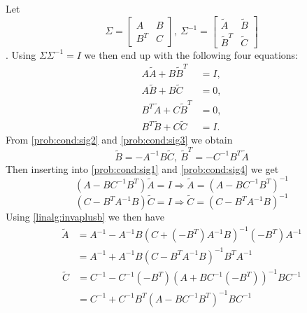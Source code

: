 Let
\begin{equation}
\Sigma = \begin{bmatrix}
A & B \\
B^T & C
\end{bmatrix},\ 
\Sigma^{-1} = \begin{bmatrix}
\tilde{A} & \tilde{B} \\
\tilde{B}^T & \tilde{C}
\end{bmatrix}
\end{equation}.
Using $\Sigma \Sigma^{-1}=I$ we then end up with the following four equations:
\begin{align}
A\tilde{A}+B\tilde{B}^T &= I, \label{prob:cond:sig1} \\
A\tilde{B} + B\tilde{C} &= 0, \label{prob:cond:sig2}\\
B^T\tilde{A} + C\tilde{B}^T &= 0, \label{prob:cond:sig3}\\
B^T\tilde{B} + C\tilde{C} &= I. \label{prob:cond:sig4}
\end{align}
From \eqref{prob:cond:sig2} and \eqref{prob:cond:sig3} we obtain
\begin{equation}
\tilde{B} = -A^{-1}B\tilde{C},\ \tilde{B}^T=-C^{-1}B^T\tilde{A}
\end{equation}
Then inserting into \eqref{prob:cond:sig1} and \eqref{prob:cond:sig4} we get
\begin{equation}
(A-BC^{-1}B^T)\tilde{A} = I \Rightarrow \tilde{A} = (A-BC^{-1}B^T)^{-1}
\end{equation}
\begin{equation}
(C-B^TA^{-1}B)\tilde{C} = I \Rightarrow \tilde{C} = (C-B^TA^{-1}B)^{-1}
\end{equation}
Using \eqref{linalg:invaplusb} we then have
\begin{align}
\tilde{A} &= A^{-1}-A^{-1}B(C+(-B^T)A^{-1}B)^{-1}(-B^T)A^{-1} \nonumber \\
&= A^{-1} + A^{-1}B(C-B^TA^{-1}B)^{-1}B^TA^{-1}
\end{align}
\begin{align}
\tilde{C} &= C^{-1} - C^{-1}(-B^T)(A+BC^{-1}(-B^T))^{-1}BC^{-1} \nonumber \\
&= C^{-1} + C^{-1}B^T(A-BC^{-1}B^T)^{-1}BC^{-1}
\end{align}

